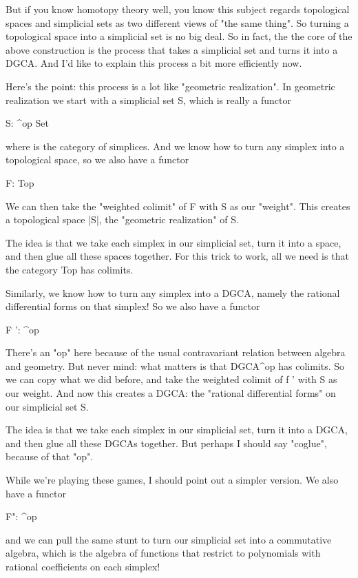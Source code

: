 But if you know homotopy theory well, you know this subject regards
topological spaces and simplicial sets as two different views of
"the same thing".  So turning a topological space into a
simplicial set is no big deal.  So in fact, the the core of the above
construction is the process that takes a simplicial set and turns it
into a DGCA.  And I'd like to explain this process a bit more
efficiently now.

Here's the point: this process is a lot like "geometric realization".
In geometric realization we start with a simplicial set S, which is 
really a functor

S: \Delta ^{op} \to  Set

where \Delta  is the category of simplices.  And we know how to turn
any simplex into a topological space, so we also have a functor

F: \Delta  \to  Top

We can then take the "weighted colimit" of F with S as our
"weight".  This creates a topological space |S|, the
"geometric realization" of S.

The idea is that we take each simplex in our simplicial set, turn
it into a space, and then glue all these spaces together.  For this
trick to work, all we need is that the category Top has colimits.

Similarly, we know how to turn any simplex into a DGCA, namely the
rational differential forms on that simplex!  So we also have a
functor

F ': \Delta  \to  [DGCAs]^{op}

There's an "op" here because of the usual contravariant relation
between algebra and geometry.  But never mind: what matters is that
DGCA^{op} has colimits.  So we can copy what we did before, and take
the weighted colimit of f ' with S as our weight.  And now this creates 
a DGCA: the "rational differential forms" on our simplicial set S.

The idea is that we take each simplex in our simplicial set, turn
it into a DGCA, and then glue all these DGCAs together.  But perhaps
I should say "coglue", because of that "op".

While we're playing these games, I should point out a simpler version.
We also have a functor

F": \Delta  {}^{op}

and we can pull the same stunt to turn our simplicial set into a 
commutative algebra, which is the algebra of functions that restrict
to polynomials with rational coefficients on each simplex!

